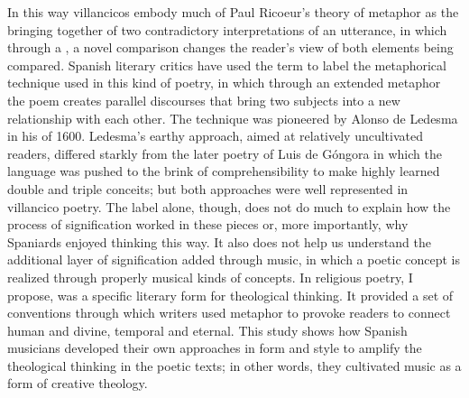 In this way villancicos embody much of Paul Ricoeur's theory of metaphor as the
bringing together of two contradictory interpretations of an utterance, in
which through a , a novel comparison changes the
reader's view of both elements being compared.%
    \Autocite{Ricoeur:InterpretationTheory}
Spanish literary critics have used the term  to label the
metaphorical technique used in this kind of poetry, in which through an
extended metaphor the poem creates parallel discourses that bring two subjects
into a new relationship with each other.%
   \Autocites
   [227--228]{Gaylord:Poetry}
   {Valbuena:Literatura}
   {Torrente:VC-chapter}
The technique was pioneered by Alonso de Ledesma in his  of 1600.
Ledesma's earthy approach, aimed at relatively uncultivated readers, differed
starkly from the later poetry of Luis de Góngora in which the language was pushed to
the brink of comprehensibility to make highly learned double and triple
conceits; but both approaches were well represented in villancico poetry.%
    \Autocites
    {Tenorio:Gongorismo}
    {Gracian:Ingenio}
The label  alone, though, does not do much to explain how the
process of signification worked in these pieces or, more importantly, why
Spaniards enjoyed thinking this way.
It also does not help us understand the additional layer of signification added
through music, in which a poetic concept is realized through properly musical
kinds of concepts.
In religious poetry, I propose,  was a specific literary form
for theological thinking.
It provided a set of conventions through which writers used metaphor to provoke
readers to connect human and divine, temporal and eternal.
This study shows how Spanish musicians developed their own approaches in form
and style to amplify the theological thinking in the poetic texts; in other
words, they cultivated music as a form of creative theology.

